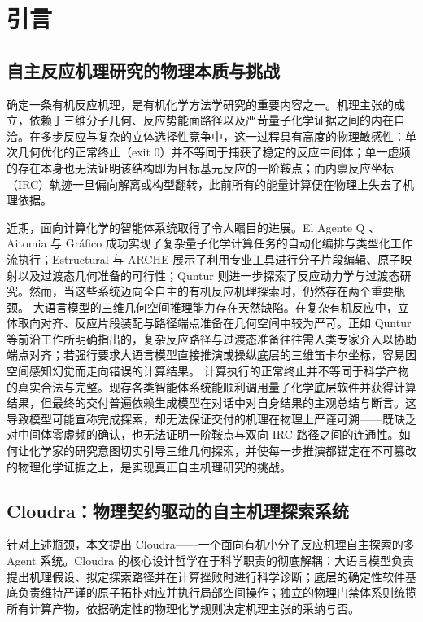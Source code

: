\section{引言}

\subsection{自主反应机理研究的物理本质与挑战}

确定一条有机反应机理，是有机化学方法学研究的重要内容之一。机理主张的成立，依赖于三维分子几何、反应势能面路径以及严苛量子化学证据之间的内在自洽。在多步反应与复杂的立体选择性竞争中，这一过程具有高度的物理敏感性：单次几何优化的正常终止（exit 0）并不等同于捕获了稳定的反应中间体；单一虚频的存在本身也无法证明该结构即为目标基元反应的一阶鞍点；而内禀反应坐标（IRC）轨迹一旦偏向解离或构型翻转，此前所有的能量计算便在物理上失去了机理依据。

近期，面向计算化学的智能体系统取得了令人瞩目的进展。El Agente Q \cite{zou2025elagente}、Aitomia \cite{aitomia2026} 与 Gráfico \cite{bai2026grafico} 成功实现了复杂量子化学计算任务的自动化编排与类型化工作流执行；Estructural \cite{choi2026estructural} 与 ARCHE \cite{li2026arche} 展示了利用专业工具进行分子片段编辑、原子映射以及过渡态几何准备的可行性；Quntur \cite{perezsanchez2026quntur} 则进一步探索了反应动力学与过渡态研究。然而，当这些系统迈向全自主的有机反应机理探索时，仍然存在两个重要瓶颈。
大语言模型的三维几何空间推理能力存在天然缺陷。在复杂有机反应中，立体取向对齐、反应片段装配与路径端点准备在几何空间中较为严苛。正如 Quntur \cite{perezsanchez2026quntur} 等前沿工作所明确指出的，复杂反应路径与过渡态准备往往需人类专家介入以协助端点对齐；若强行要求大语言模型直接推演或操纵底层的三维笛卡尔坐标，容易因空间感知幻觉而走向错误的计算结果。
计算执行的正常终止并不等同于科学产物的真实合法与完整。现存各类智能体系统能顺利调用量子化学底层软件并获得计算结果，但最终的交付普遍依赖生成模型在对话中对自身结果的主观总结与断言。这导致模型可能宣称完成探索，却无法保证交付的机理在物理上严谨可溯——既缺乏对中间体零虚频的确认，也无法证明一阶鞍点与双向 IRC 路径之间的连通性。如何让化学家的研究意图切实引导三维几何探索，并使每一步推演都锚定在不可篡改的物理化学证据之上，是实现真正自主机理研究的挑战。

\subsection{Cloudra：物理契约驱动的自主机理探索系统}

针对上述瓶颈，本文提出 Cloudra——一个面向有机小分子反应机理自主探索的多 Agent 系统。Cloudra 的核心设计哲学在于科学职责的彻底解耦：大语言模型负责提出机理假设、拟定探索路径并在计算挫败时进行科学诊断；底层的确定性软件基底负责维持严谨的原子拓扑对应并执行局部空间操作；独立的物理门禁体系则统揽所有计算产物，依据确定性的物理化学规则决定机理主张的采纳与否。

